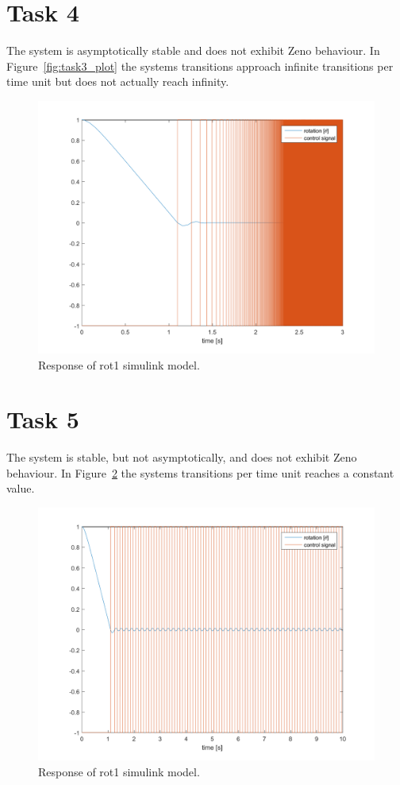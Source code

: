 \documentclass[a4paper,12pt,oneside,onecolumn]{article} %
\begin{document}
\section*{Task 4}
        The system is asymptotically stable and does not exhibit Zeno
        behaviour. In Figure~\ref{fig:task3_plot} the systems
        transitions approach infinite transitions per time unit but does
        not actually reach infinity.
	\begin{figure}[H]
        \centering
        \includegraphics[scale = 0.5]{../matlab/images/task4_plot.png}
        \caption{Response of rot1 simulink model.}
        \label{fig:task4_plot}
    \end{figure}

\section*{Task 5}

	The system is stable, but not asymptotically, and does not exhibit Zeno behaviour. In Figure~\ref{fig:task5_plot} the systems transitions per time unit reaches a constant value.
	\begin{figure}[H]
        \centering
        \includegraphics[scale = 0.5, width=1\linewidth]{../matlab/images/task5_plot.png}
        \caption{Response of rot1 simulink model.}
        \label{fig:task5_plot}
    \end{figure}
\end{document}
